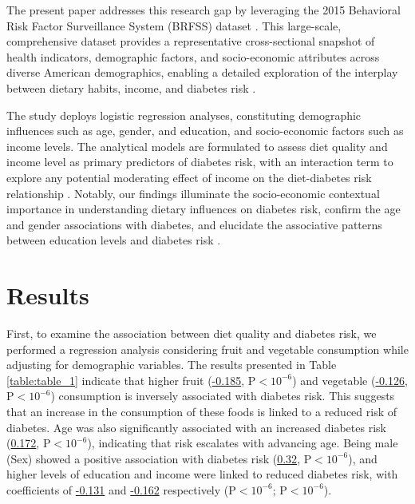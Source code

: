\documentclass[11pt]{article}
\begin{document}
The present paper addresses this research gap by leveraging the 2015 Behavioral Risk Factor Surveillance System (BRFSS) dataset \cite{Rolle-Lake2020BehavioralRF}. This large-scale, comprehensive dataset provides a representative cross-sectional snapshot of health indicators, demographic factors, and socio-economic attributes across diverse American demographics, enabling a detailed exploration of the interplay between dietary habits, income, and diabetes risk \cite{Pierannunzi2013ASR}.

The study deploys logistic regression analyses, constituting demographic influences such as age, gender, and education, and socio-economic factors such as income levels. The analytical models are formulated to assess diet quality and income level as primary predictors of diabetes risk, with an interaction term to explore any potential moderating effect of income on the diet-diabetes risk relationship \cite{Wu2016GeneticVA}. Notably, our findings illuminate the socio-economic contextual importance in understanding dietary influences on diabetes risk, confirm the age and gender associations with diabetes, and elucidate the associative patterns between education levels and diabetes risk \cite{Bruni2016GlobalEO}.

\section*{Results}

First, to examine the association between diet quality and diabetes risk, we performed a regression analysis considering fruit and vegetable consumption while adjusting for demographic variables. The results presented in Table {}\ref{table:table_1} indicate that higher fruit (\hyperlink{A2a}{-0.185}, P$<$\hyperlink{A2d}{$10^{-6}$}) and vegetable (\hyperlink{A3a}{-0.126}, P$<$\hyperlink{A3d}{$10^{-6}$}) consumption is inversely associated with diabetes risk. This suggests that an increase in the consumption of these foods is linked to a reduced risk of diabetes. Age was also significantly associated with an increased diabetes risk (\hyperlink{A4a}{0.172}, P$<$\hyperlink{A4d}{$10^{-6}$}), indicating that risk escalates with advancing age. Being male (Sex) showed a positive association with diabetes risk (\hyperlink{A5a}{0.32}, P$<$\hyperlink{A5d}{$10^{-6}$}), and higher levels of education and income were linked to reduced diabetes risk, with coefficients of \hyperlink{A6a}{-0.131} and \hyperlink{A7a}{-0.162} respectively (P$<$\hyperlink{A6d}{$10^{-6}$}; P$<$\hyperlink{A7d}{$10^{-6}$}).
\end{document}
